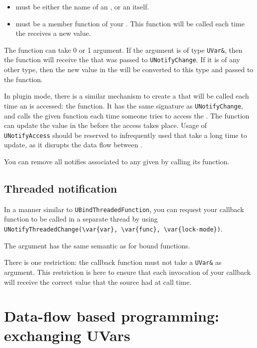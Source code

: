 \begin{itemize}
\item {} must be either the name of an \UVar, or an \UVar itself.
\item {} must be a member function of your \UObject. This function
will be called each time the \UVar receives a new value.
\end{itemize}

The function can take 0 or 1 argument. If the argument is of type
\lstinline{UVar&}, then the function will receive the \UVar that was passed
to \lstinline{UNotifyChange}. If it is of any other type, then the new value
in the \UVar will be converted to this type and passed to the function.

In plugin mode, there is a similar mechanism to create a  that will be called each time an \UVar is accessed: the
 function. It has the same signature as
\lstinline{UNotifyChange}, and calls the given function each time someone
tries to access the \UVar. The function can update the value in the \UVar
before the access takes place. Usage of \lstinline{UNotifyAccess} should be
reserved to infrequently used \UVar that take a long time to update, as it
disrupts the data flow between \UObject.


You can remove all notifies associated to any given \UVar by calling its
 function.

\subsection{Threaded notification}

In a manner similar to \lstinline{UBindThreadedFunction}, you can request
your callback function to be called in a separate thread by using
\lstinline|UNotifyThreadedChange(\var{var}, \var{func}, \var{lock-mode})|.

The  argument has the same semantic as for bound functions.

There is one restriction: the callback function must not take a
\lstinline{UVar&} as argument. This restriction is here to ensure that each
invocation of your callback will receive the correct value that the source
\UVar had at call time.

\section{Data-flow based programming: exchanging UVars}

